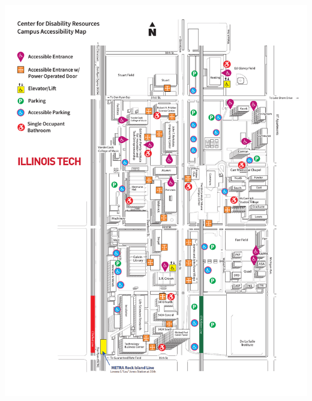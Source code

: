 \begin{center}
	\includegraphics[width = \textwidth] {Photos/mies-campus-accessibility-map-2022.pdf}
\end{center}



